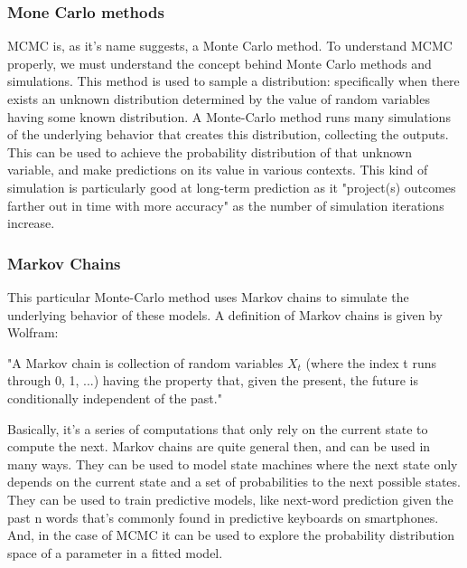 \documentclass [letterpaper, 12pt] {article}
\begin{document}
\subsubsection{Mone Carlo methods}
MCMC is, as it's name suggests, a Monte Carlo method. To understand MCMC properly, we must understand the concept behind Monte Carlo methods and simulations. This method is used to sample a distribution: specifically when there exists an unknown distribution determined by the value of random variables having some known distribution. A Monte-Carlo method runs many simulations of the underlying behavior that creates this distribution, collecting the outputs. \cite{holmes} This can be used to achieve the probability distribution of that unknown variable, and make predictions on its value in various contexts. This kind of simulation is particularly good at long-term prediction as it "project(s) outcomes farther out in time with more accuracy" as the number of simulation iterations increase. \cite{ibm_cloud_2020}

\subsubsection{Markov Chains}
This particular Monte-Carlo method uses Markov chains to simulate the underlying behavior of these models. A definition of Markov chains is given by Wolfram:

"A Markov chain is collection of random variables ${X_t}$ (where the index t runs through 0, 1, ...) having the property that, given the present, the future is conditionally independent of the past." \cite{weisstein}

Basically, it's a series of computations that only rely on the current state to compute the next.
Markov chains are quite general then, and can be used in many ways. They can be used to model state machines where the next state only depends on the current state and a set of probabilities to the next possible states. They can be used to train predictive models, like next-word prediction given the past n words that's commonly found in predictive keyboards on smartphones. And, in the case of MCMC it can be used to explore the probability distribution space of a parameter in a fitted model.
\end{document}
